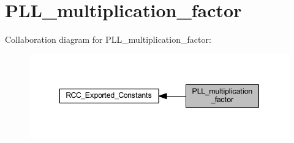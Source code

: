 \hypertarget{group___p_l_l__multiplication__factor}{}\section{P\+L\+L\+\_\+multiplication\+\_\+factor}
\label{group___p_l_l__multiplication__factor}
Collaboration diagram for P\+L\+L\+\_\+multiplication\+\_\+factor\+:
\nopagebreak
\begin{figure}[H]
\begin{center}
\leavevmode
\includegraphics[width=343pt]{group___p_l_l__multiplication__factor}
\end{center}
\end{figure}
